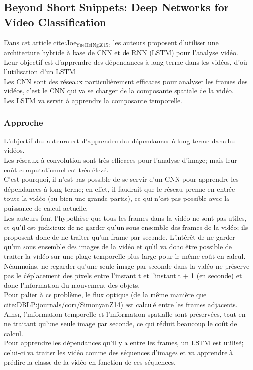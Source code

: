 \documentclass[11pt]{article}
\begin{document}
\subsection{Beyond Short Snippets: Deep Networks for Video Classification}
\label{sec:orgd6fa1c4}
Dans cet article cite:Joe\(_{\text{Yue}}\)\(_{\text{Hei}}\)\(_{\text{Ng}}\)\(_{\text{2015}}\), les auteurs proposent d'utiliser une architecture hybride à base de CNN et de RNN (LSTM) pour l'analyse vidéo.\\
Leur objectif est d'apprendre des dépendances à long terme dans les vidéos, d'où l'utilisation d'un LSTM.\\
Les CNN sont des réseaux particulièrement efficaces pour analyser les frames des vidéos, c'est le CNN qui va se charger de la composante spatiale de la vidéo.\\
Les LSTM va servir à apprendre la composante temporelle.\\

\subsubsection{Approche}
\label{sec:orgfef058f}
L'objectif des auteurs est d'apprendre des dépendances à long terme dans les vidéos.\\
Les réseaux à convolution sont très efficaces pour l'analyse d'image; mais leur coût computationnel est très élevé.\\
C'est pourquoi, il n'est pas possible de se servir d'un CNN pour apprendre les dépendances à long terme; en effet, il faudrait que le réseau prenne en entrée toute la vidéo (ou bien une grande partie), ce qui n'est pas possible avec la puissance de calcul actuelle.\\
Les auteurs font l'hypothèse que tous les frames dans la vidéo ne sont pas utiles, et qu'il est judicieux de ne garder qu'un sous-ensemble des frames de la vidéo; ils proposent donc de ne traiter qu'un frame par seconde. L'intérêt de ne garder qu'un sous ensemble des images de la vidéo et qu'il va donc être possible de traiter la vidéo sur une plage temporelle plus large pour le même coût en calcul.\\
Néanmoins, ne regarder qu'une seule image par seconde dans la vidéo ne préserve pas le déplacement des pixels entre l'instant t et l'instant t + 1 (en seconde) et donc l'information du mouvement des objets.\\
Pour palier à ce problème, le flux optique (de la même manière que cite:DBLP:journals/corr/SimonyanZ14) est calculé entre les frames adjacents.\\
Ainsi, l'information temporelle et l'information spatialle sont préservées, tout en ne traitant qu'une seule image par seconde, ce qui réduit beaucoup le coût de calcul.\\
Pour apprendre les dépendances qu'il y a entre les frames, un LSTM est utilisé; celui-ci va traiter les vidéo comme des séquences d'images et va apprendre à prédire la classe de la vidéo en fonction de ces séquences.\\
\end{document}

